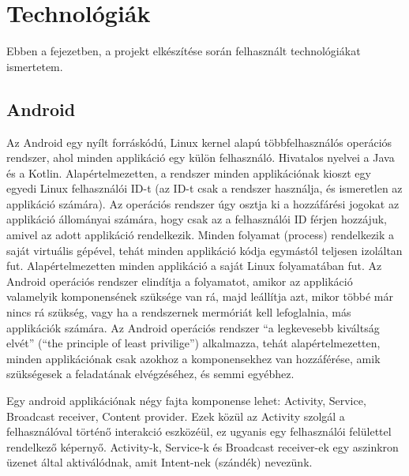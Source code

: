 \chapter{Technológiák}\label{ch:ALAP}

\begin{osszefoglal}
	Ebben a fejezetben, a projekt elkészítése során felhasznált technológiákat ismertetem.
	
\end{osszefoglal}

\section{Android}\label{sec:ALAP:ml}

Az Android egy nyílt forráskódú, Linux kernel alapú többfelhasználós operációs rendszer, ahol minden applikáció egy külön felhasználó. Hivatalos nyelvei a Java és a Kotlin. Alapértelmezetten, a rendszer minden applikációnak kioszt egy egyedi Linux felhasználói ID-t (az ID-t csak a rendszer használja, és ismeretlen az applikáció számára). Az operációs rendszer úgy osztja ki a hozzáfárési jogokat az applikáció állományai számára, hogy csak az a felhasználói ID férjen hozzájuk, amivel az adott applikáció rendelkezik. Minden folyamat (process) rendelkezik a saját virtuális gépével, tehát minden applikáció kódja egymástól teljesen izoláltan fut. Alapértelmezetten minden applikáció a saját Linux folyamatában fut. Az Android operációs rendszer elindítja a folyamatot, amikor az applikáció valamelyik komponensének szüksége van rá, majd leállítja azt, mikor többé már nincs rá szükség, vagy ha a rendszernek mermóriát kell lefoglalnia, más applikációk számára. Az Android operációs rendszer “a legkevesebb kiváltság elvét” (“the principle of least privilige”) alkalmazza, tehát alapértelmezetten, minden applikációnak csak azokhoz a komponensekhez van hozzáférése, amik szükségesek a feladatának elvégzéséhez, és semmi egyébhez.

Egy android applikációnak négy fajta komponense lehet: Activity, Service, Broadcast receiver, Content provider. Ezek közül az Activity szolgál a felhasználóval történő interakció eszközéül, ez ugyanis egy felhasználói felülettel rendelkező képernyő. Activity-k, Service-k és Broadcast receiver-ek egy aszinkron üzenet által aktiválódnak, amit Intent-nek (szándék) nevezünk.

